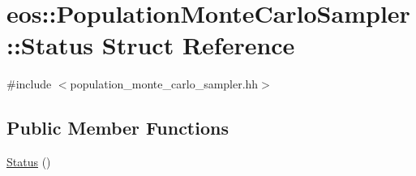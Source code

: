 \hypertarget{structeos_1_1PopulationMonteCarloSampler_1_1Status}{
\section{eos::PopulationMonteCarloSampler::Status Struct Reference}
\label{structeos_1_1PopulationMonteCarloSampler_1_1Status}
}


{\ttfamily \#include $<$population\_\-monte\_\-carlo\_\-sampler.hh$>$}\subsection*{Public Member Functions}
\begin{DoxyCompactItemize}
\item 
\hyperlink{structeos_1_1PopulationMonteCarloSampler_1_1Status_a8f69a829df5ad6a829a737c4eb9c368c}{Status} ()
\end{DoxyCompactItemize}
